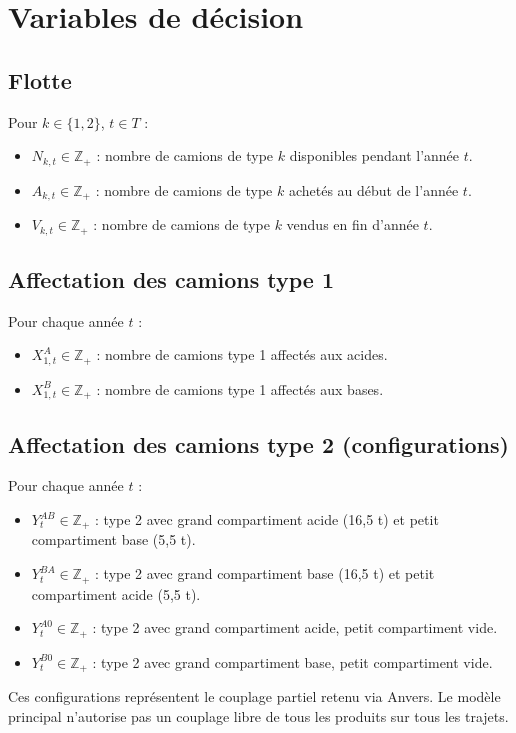 \documentclass{article}
\begin{document}
\section{Variables de décision}

\subsection{Flotte}

Pour $k \in \{1,2\}$, $t \in T$ :
\begin{itemize}
  \item $N_{k,t} \in \mathbb{Z}_+$ : nombre de camions de type $k$ disponibles pendant l'année $t$.
  \item $A_{k,t} \in \mathbb{Z}_+$ : nombre de camions de type $k$ achetés au début de l'année $t$.
  \item $V_{k,t} \in \mathbb{Z}_+$ : nombre de camions de type $k$ vendus en fin d'année $t$.
\end{itemize}

\subsection{Affectation des camions type 1}

Pour chaque année $t$ :
\begin{itemize}
  \item $X^{A}_{1,t} \in \mathbb{Z}_+$ : nombre de camions type 1 affectés aux acides.
  \item $X^{B}_{1,t} \in \mathbb{Z}_+$ : nombre de camions type 1 affectés aux bases.
\end{itemize}

\subsection{Affectation des camions type 2 (configurations)}

Pour chaque année $t$ :
\begin{itemize}
  \item $Y^{AB}_t \in \mathbb{Z}_+$ : type 2 avec grand compartiment acide (16{,}5 t) et petit compartiment base (5{,}5 t).
  \item $Y^{BA}_t \in \mathbb{Z}_+$ : type 2 avec grand compartiment base (16{,}5 t) et petit compartiment acide (5{,}5 t).
  \item $Y^{A0}_t \in \mathbb{Z}_+$ : type 2 avec grand compartiment acide, petit compartiment vide.
  \item $Y^{B0}_t \in \mathbb{Z}_+$ : type 2 avec grand compartiment base, petit compartiment vide.
\end{itemize}
Ces configurations représentent le couplage partiel retenu via Anvers. Le
modèle principal n'autorise pas un couplage libre de tous les produits sur tous
les trajets.
\end{document}
